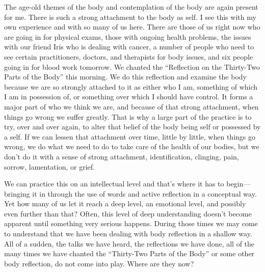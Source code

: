 
The age-old themes of the body and contemplation of the body are again 
present for me. There is such a strong attachment to the body as self. 
I see this with my own experience and with so many of us here. There 
are those of us right now who are going in for physical exams, those 
with ongoing health problems, the issues with our friend Iris who is 
dealing with cancer, a number of people who need to see certain 
practitioners, doctors, and therapists for body issues, and six people 
going in for blood work tomorrow. We chanted the ``Reflection on the 
Thirty-Two Parts of the Body'' this morning. We do this reflection and 
examine the body because we are so strongly attached to it as either 
who I am, something of which I am in possession of, or something over 
which I should have control. It forms a major part of who we think we 
are, and because of that strong attachment, when things go wrong we 
suffer greatly. That is why a large part of the practice is to try, 
over and over again, to alter that belief of the body being self or 
possessed by a self. If we can lessen that attachment over time, little 
by little, when things go wrong, we do what we need to do to take care 
of the health of our bodies, but we don't do it with a sense of strong 
attachment, identification, clinging, pain, sorrow, lamentation, or 
grief.

We can practice this on an intellectual level and that's where it has 
to begin---bringing it in through the use of words and active 
reflection in a conceptual way. Yet how many of us let it reach a deep 
level, an emotional level, and possibly even further than that? Often, 
this level of deep understanding doesn't become apparent until 
something very serious happens. During those times we may come to 
understand that we have been dealing with body reflection in a shallow 
way. All of a sudden, the talks we have heard, the reflections we have 
done, all of the many times we have chanted the ``Thirty-Two Parts of 
the Body'' or some other body reflection, do not come into play. Where 
are they now?

